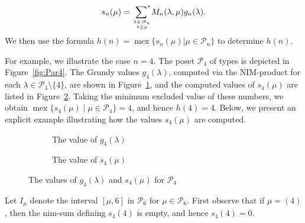 \documentclass[a4paper,11pt]{amsart}
\theoremstyle{definition}
\newcommand{\mex}{\operatorname{mex}}
\newcommand{\nimsum}{{\sum}^{*}}
\numberwithin{equation}{section}
\def\Par{\mathscr{P}}
\begin{document}
\begin{equation}\label{eq:sn(mu)}
s_{n}(\mu)=\underset{{\lambda\in\Par_{n}}\atop{\lambda\geq\mu}}{\,\,\nimsum}M_{n}(\lambda,\mu) g_{n}(\lambda).
\end{equation}
We then use the formula $h(n)=\mex\{s_{n}(\mu)|\mu\in\Par_{n}\}$ to determine $h(n)$.
%
%
%
\par
%
For example, we illustrate the case $n=4$.
The poset $\Par_{4}$ of types is depicted in Figure~\ref{fig:Par4}.
The Grundy values $g_{4}(\lambda)$,
computed via the NIM-product for each $\lambda\in\Par_{4}\setminus\{4\}$, 
are shown in Figure~\ref{fig:Grundy-Pi4},
and the computed values of $s_{4}(\mu)$ are listed in Figure~\ref{fig:s6(mu)}.
Taking the minimum excluded value of these numbers, we obtain
$\mex\{s_{4}(\mu)\mid \mu\in\Par_{4}\}=4$, and hence $h(4)=4$.
Below, we present an explicit example illustrating how the values $s_{4}(\mu)$ are computed.
%
\begin{figure}[htbp]
{\tiny
\centering
\begin{subfigure}[b]{0.4\textwidth}
    \centering
{}
    \caption{%
The value of $g_{4}(\lambda)$}
    \label{fig:Grundy-Pi4}
\end{subfigure}
}
\hfill
{\tiny
\begin{subfigure}[b]{0.4\textwidth}
    \centering
{}
    \caption{The value of $s_{4}(\mu)$}
    \label{fig:s6(mu)}
\end{subfigure}
}
\caption{The values of $g_{4}(\lambda)$ and $s_{4}(\mu)$ for $\Par_{4}$}
\label{fig:s6Par}
\end{figure}
%
Let $I_{\mu}$ denote the interval $[\mu,6]$ in $\Par_{6}$ for $\mu\in\Par_{6}$.
%
First observe that 
if $\mu=(4)$, then the nim-sum defining $s_{4}(4)$ is empty, and hence $s_{4}(4)=0$.
\end{document}
